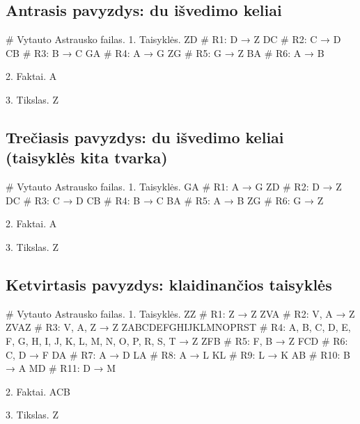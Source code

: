 \subsection{Antrasis pavyzdys: du išvedimo keliai}

\begin{pythonaienv}[bc]
# Vytauto Astrausko failas.
1. Taisyklės.
ZD                                      # R1: D → Z
DC                                      # R2: C → D
CB                                      # R3: B → C
GA                                      # R4: A → G
ZG                                      # R5: G → Z
BA                                      # R6: A → B

2. Faktai.
A

3. Tikslas.
Z
\end{pythonaienv}

\subsection{Trečiasis pavyzdys: du išvedimo keliai (taisyklės kita tvarka)}

\begin{pythonaienv}[bc]
# Vytauto Astrausko failas.
1. Taisyklės.
GA                                      # R1: A → G
ZD                                      # R2: D → Z
DC                                      # R3: C → D
CB                                      # R4: B → C
BA                                      # R5: A → B
ZG                                      # R6: G → Z

2. Faktai.
A

3. Tikslas.
Z
\end{pythonaienv}

\subsection{Ketvirtasis pavyzdys: klaidinančios taisyklės}

\begin{pythonaienv}[bc]
# Vytauto Astrausko failas.
1. Taisyklės.
ZZ                                      # R1: Z → Z
ZVA                                     # R2: V, A → Z
ZVAZ                                    # R3: V, A, Z → Z
ZABCDEFGHIJKLMNOPRST                    # R4: A, B, C, D, E, F, G, H, I, J, K, L, M, N, O, P, R, S, T → Z
ZFB                                     # R5: F, B → Z
FCD                                     # R6: C, D → F
DA                                      # R7: A → D
LA                                      # R8: A → L
KL                                      # R9: L → K
AB                                      # R10: B → A
MD                                      # R11: D → M

2. Faktai.
ACB

3. Tikslas.
Z
\end{pythonaienv}

